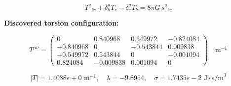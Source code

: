 
\begin{equation}
  T^a{}_{bc} + \delta^a_b T_c - \delta^a_c T_b = 8\pi G \, s^a{}_{bc}
\end{equation}

\textbf{Discovered torsion configuration:}

\begin{equation}
  T^{\mu\nu} = \begin{pmatrix}
    0 & 0.840968 & 0.549972 & -0.824084 \\
    -0.840968 & 0 & -0.543844 & 0.009838 \\
    -0.549972 & 0.543844 & 0 & -0.001094 \\
    0.824084 & -0.009838 & 0.001094 & 0
  \end{pmatrix} \quad \text{m}^{-1}
\end{equation}

\begin{equation}
  |T| = 1.4088e+0 \text{ m}^{-1}, \quad
  \lambda = -9.8954, \quad
  \sigma = 1.7435e-2 \text{ J}\cdot\text{s/m}^3
\end{equation}
